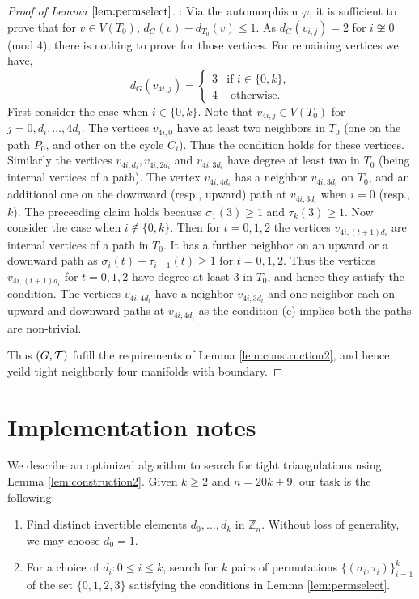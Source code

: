 \documentclass[11pt]{article}
\begin{document}
\begin{proof}[Proof of Lemma $\ref{lem:permselect}$]
:
Via the automorphism $\varphi$, it is sufficient to prove that for $v\in
V(T_0)$, $d_G(v)-d_{T_0}(v)\leq 1$. As $d_G(v_{i,j})=2$ for $i\not\cong 0$
(mod $4$), there is nothing to prove for those vertices. For remaining
vertices we have,
\begin{equation}
d_G(v_{4i,j}) = \begin{cases}
	3 & \text{if } i\in \{0,k\}, \\
	4 & \text{ otherwise. }
\end{cases}
\end{equation}
First consider the case when $i\in \{0,k\}$. Note that $v_{4i,j}\in V(T_0)$
for $j=0,d_i,\ldots,4d_i$. The vertices $v_{4i,0}$ have at least two
neighbors in $T_0$ (one on the path $P_0$, and other on the cycle $C_i$).
Thus the condition holds for these vertices. Similarly the vertices
$v_{4i,d_i},v_{4i,2d_i}$ and $v_{4i,3d_i}$ have degree at least two in $T_0$ (being internal
vertices of a path). The vertex $v_{4i,4d_i}$ has a neighbor $v_{4i,3d_i}$
on $T_0$, and an additional one on the downward (resp., upward) path at
$v_{4i,3d_i}$ when $i=0$ (resp., $k$). The preceeding claim holds because
$\sigma_1(3)\geq 1$ and $\tau_k(3)\geq 1$. Now consider the case when
$i\not\in \{0,k\}$. Then for $t=0,1,2$ the vertices $v_{4i,(t+1)d_i}$ are
internal vertices of a path in $T_0$. It has a further neighbor on an
upward or a downward path as $\sigma_i(t)+\tau_{i-1}(t)\geq 1$ for $t=0,1,2$.
Thus the vertices $v_{4i,(t+1)d_i}$ for $t=0,1,2$ have degree at least $3$ in $T_0$, and
hence they satisfy the condition. The vertices $v_{4i,4d_i}$ have a
neighbor $v_{4i,3d_i}$ and one neighbor each on upward and downward paths
at $v_{4i,4d_i}$ as the condition (c) implies both the paths are
non-trivial. 

Thus $(G,{\cal T})$ fufill the requirements of Lemma
\ref{lem:construction2}, and hence yeild tight neighborly four manifolds
with boundary. 
\end{proof}

\section{Implementation notes}
We describe an optimized algorithm to search for tight triangulations using
Lemma \ref{lem:construction2}. Given $k\geq
2$ and $n=20k+9$, our task is the following:
\begin{enumerate}[{\rm (i)}]
\item Find distinct invertible elements $d_0,\ldots,d_k$ in $\mathbb{Z}_n$.
Without loss of generality, we may choose $d_0=1$.
\item For a choice of $d_i:0\leq i\leq k$, search for $k$ pairs of
permutations
$\{(\sigma_i,\tau_i)\}_{i=1}^k$ of the set $\{0,1,2,3\}$ satisfying the
conditions in Lemma \ref{lem:permselect}.
\end{enumerate}
\end{document}
